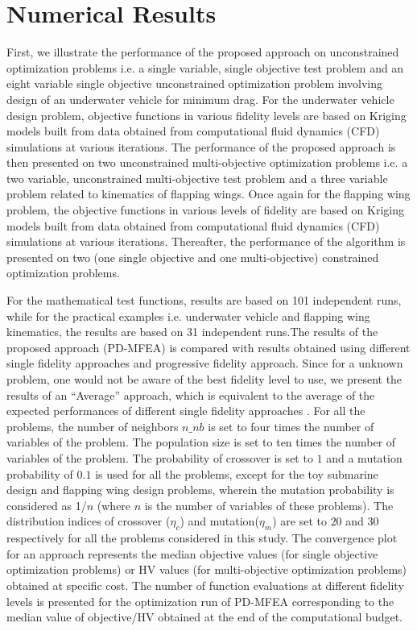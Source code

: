 \section{Numerical Results}\label{sec:results}
First, we illustrate the performance of the proposed approach on unconstrained optimization problems i.e. a single variable, single objective test problem and an eight variable single objective unconstrained optimization problem involving design of an underwater vehicle for minimum drag. For the underwater vehicle design problem, objective functions in various fidelity levels are based on Kriging models built from data obtained from computational fluid dynamics (CFD) simulations at various iterations. The performance of the proposed approach is then presented on two unconstrained multi-objective optimization problems i.e. a two variable, unconstrained multi-objective test problem and a three variable problem related to kinematics of flapping wings. Once again for the flapping wing problem, the objective functions in various levels of fidelity are based on Kriging models built from data obtained from computational fluid dynamics (CFD) simulations at various iterations. Thereafter, the performance of the algorithm is presented on two (one single objective and one multi-objective) constrained optimization problems.

For the mathematical test functions, results are based on 101 independent runs, while for the practical examples i.e. underwater vehicle and flapping wing kinematics, the results are based on 31 independent runs.The results of the proposed approach (PD-MFEA) is compared with results obtained using different single fidelity approaches and progressive fidelity approach. Since for a unknown problem, one would not be aware of the best fidelity level  to use, we present the results of an ``Average'' approach, which is equivalent to the average of the expected performances of different single fidelity approaches \cite{branke2016par}. For all the problems, the number of neighbors $n\_nb$ is set to four times the number of variables of the problem. The population size is set to ten times the number of variables of the problem. The probability of crossover is set to $1$ and a mutation probability of $0.1$ is used for all the problems, except for the toy submarine design and flapping wing design problems, wherein the mutation probability is considered as 1/$n$ (where $n$ is the number of variables of these problems). The distribution indices of crossover ($\eta_c$) and mutation($\eta_m$) are set to $20$ and $30$ respectively for all the problems considered in  this study. The convergence plot for an approach represents the median objective values (for single objective optimization problems) or HV values (for multi-objective optimization problems) obtained at specific cost. The number of function evaluations at different fidelity levels is presented for the optimization run of PD-MFEA corresponding to the median value of objective/HV obtained at the end of the computational budget.  

